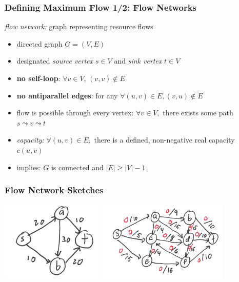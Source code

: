 \documentclass[10pt,aspectratio=169]{beamer}
\begin{document}
\begin{frame} \frametitle{Defining Maximum Flow 1/2: Flow Networks}
\emph{flow network:} graph representing resource flows
\begin{itemize}
  \item directed graph $G=(V, E)$
  \item designated \emph{source vertex} $s \in V$ and \emph{sink vertex} $t \in V$
  \item \textbf{no self-loop}: $\forall v \in V$, $(v, v) \notin E$
  \item \textbf{no antiparallel edges}: for any $\forall (u, v) \in E, (v, u) \notin E$
  \item flow is possible through every vertex: $\forall v \in V,$ there exists
    some path $s \leadsto v \leadsto t$
  \item \emph{capacity:} $\forall (u, v) \in E,$ there is a defined,
    non-negative real capacity $c(u, v)$
  \item implies: $G$ is connected and $|E| \geq |V|-1$
\end{itemize}
\end{frame}

\begin{frame} \frametitle{Flow Network Sketches}
\begin{center}
  \includegraphics[height=1.5in]{flownetwork-1.png} \includegraphics[height=1.5in]{flownetwork-2.png}
\end{center}
\end{frame}
\end{document}
